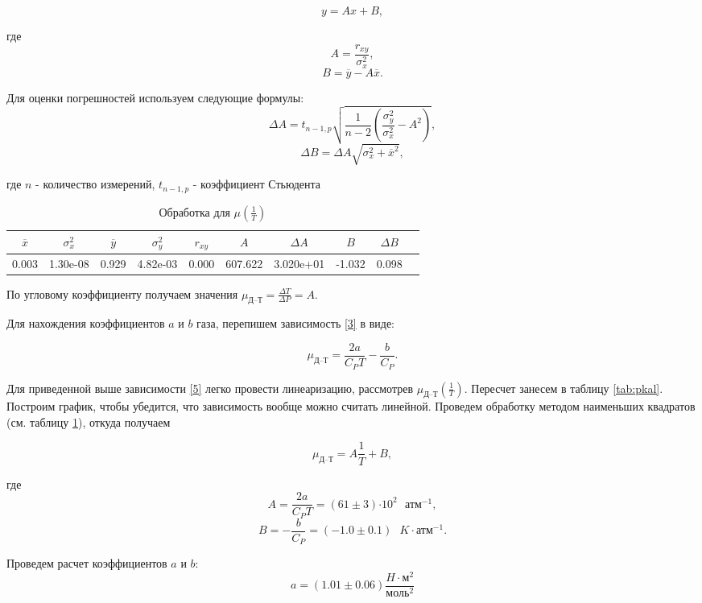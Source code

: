 \documentclass[12pt,a4paper]{article}
\newcommand{\e}[1]{\text{$\cdot10^{#1}$}}
\begin{document}
$$y = Ax + B,$$

где $$A = \frac{r_{xy}}{ \sigma_x^2},$$
$$B = \overline{y} - A\overline{x}.$$

Для оценки погрешностей используем следующие формулы:
$$\Delta A =  t_{n-1, p} \sqrt{\frac{1}{n-2} \left( \frac{\sigma_y^2}{\sigma_x^2} - A^2 \right)},$$
$$\Delta B = \Delta A \sqrt{\sigma_x^2 + \overline{x}^2},$$

где 
$n$ - количество измерений, $ t_{n-1, p}$ - коэффициент Стьюдента

\begin{table}
	
	\caption{Обработка для $\mu \left(\frac{1}{T}\right)$}
	\label{tab:ab}
	\centering
	\footnotesize
	\begin{tabular}{|c|c|c|c|c|c|c|c|c|c|}
		\hline
		$\overline{x}$ & $\sigma_x^2$ & $\overline{y}$ & $\sigma_y^2$ & $r_{xy}$ & $A$ & $\Delta A$ & $B$ & $\Delta B$ \\ \hline
		0.003 & 1.30e-08 & 0.929 & 4.82e-03 & 0.000 & 607.622 & 3.020e+01 & -1.032 & 0.098 \\ \hline
	\end{tabular}
\end{table}
По угловому коэффициенту получаем значения $\mu_\text{Д--Т} = \frac{\Delta T}{\Delta P} = A$.

Для нахождения коэффициентов $a$ и $b$ газа, перепишем зависимость \ref{3} в виде:

\begin{equation}\label{5}
	\mu_\text{Д--Т} = \frac{2a}{C_P T} - \frac{b}{C_P}.
\end{equation}

Для приведенной выше зависимости \ref{5} легко провести линеаризацию, рассмотрев $\mu_\text{Д--Т}\left(\frac{1}{T}\right)$. Пересчет занесем в таблицу \ref{tab:pkal}. Построим график, чтобы убедится, что зависимость вообще можно считать линейной. Проведем обработку методом наименьших квадратов (см. таблицу \ref{tab:ab}), откуда получаем

\begin{equation}
	\mu_\text{Д--Т} = A\frac{1}{T} + B,
\end{equation}

где $$A = \frac{2a}{C_P T} = (61 \pm 3)\e{2} \text{  }\text{атм}^{-1}, $$
	$$B = - \frac{b}{C_P} = (-1.0 \pm 0.1) \text{  }K\cdot \text{атм}^{-1}.$$

Проведем расчет коэффициентов $a$ и $b$:
$$a = (1.01 \pm 0.06) \frac{H\cdot\text{м}^2}{\text{моль}^2}$$
\end{document}
